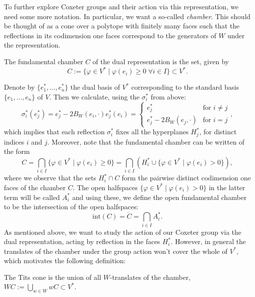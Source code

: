 To further explore Coxeter groups and their action via this representation, we need some more notation.
In particular, we want a so-called \emph{chamber}.
This should be thought of as a cone over a polytope with finitely many faces such that the reflections in its codimension one faces correspond to the generators of \(W\) under the representation.

\begin{definition}\label{def:chamber}
    The fundamental chamber \(C\) of the dual representation is the set, given by
    \[C := \{\varphi \in V^* \;\vert\; \varphi (e_i) \geq 0 \;\forall i\in I\} \subset V^*.\]
\end{definition}

Denote by \(\{e_1^*,\ldots, e_n^*\}\) the dual basis of \(V^*\) corresponding to the standard basis \(\{e_1,\ldots, e_n\}\) of \(V\).
Then we calculate, using the \(\sigma_i^*\) from above:
\begin{equation*}
    \sigma_i^*(e_j^*) = e_j^* - 2B_W(e_i,\cdot)e_j^*(e_i) =
    \begin{cases}
        e_j^*                   & \text{for } i\neq j \\
        e_j^* - 2B_W(e_j,\cdot) & \text{for } i=j
    \end{cases},
\end{equation*}
which implies that each reflection \(\sigma_i^*\) fixes all the hyperplanes \(H_j^*\), for distinct indices \(i\) and \(j\).
Moreover, note that the fundamental chamber can be written of the form %
\[C = \bigcap_{i\in I}\{\varphi\in V^*\;\vert\; \varphi(e_i)\geq 0\} = \bigcap_{i\in I} (H_i^* \cup \{\varphi\in V^*\;\vert\; \varphi(e_i)> 0\}),\]
where we observe that the sets \(H_i^*\cap C\) form the pairwise distinct codimension one faces of the chamber \(C\).
The open halfspaces \(\{\varphi \in V^* \;\vert\; \varphi(e_i) > 0\}\) in the latter term will be called \(A_i^*\) and using these, we define the open fundamental chamber to be the intersection of the open halfspaces:
\[\text{int}(C) = \mathring{C} = \bigcap_{i \in I} A_i^*.\] %
As mentioned above, we want to study the action of our Coxeter group via the dual representation, acting by reflection in the faces \(H_i^*\).
However, in general the translates of the chamber under the group action won't cover the whole of \(V^*\), which motivates the following definition:

\begin{definition}
    The Tits cone is the union of all \(W\)-translates of the chamber, \(WC := \underset{w \in W}{\bigcup} wC \subset V^*\).
\end{definition}

